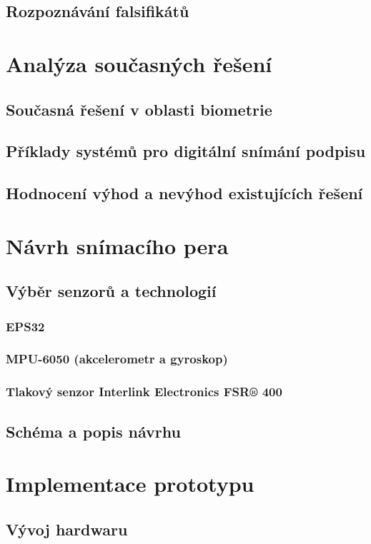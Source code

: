 \section{Rozpoznávání falsifikátů}

\chapter{Analýza současných řešení}
\section{Současná řešení v oblasti biometrie}
\section{Příklady systémů pro digitální snímání podpisu}
\section{Hodnocení výhod a nevýhod existujících řešení}

\chapter{Návrh snímacího pera}
\section{Výběr senzorů a technologií}
\subsection{EPS32}
\subsection{MPU-6050 (akcelerometr a gyroskop)}
\subsection{Tlakový senzor Interlink Electronics FSR® 400}
\section{Schéma a popis návrhu}

\chapter{Implementace prototypu}
\section{Vývoj hardwaru}
